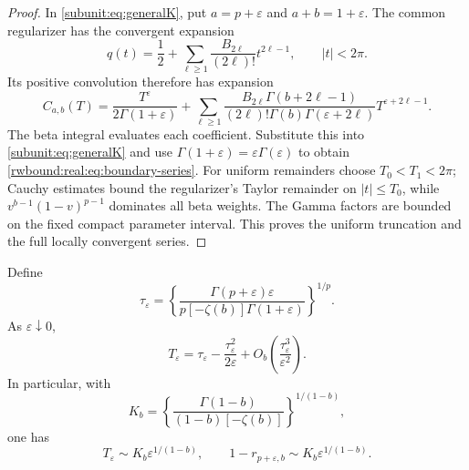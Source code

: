 \begin{proof}
In \eqref{subunit:eq:generalK}, put $a=p+\varepsilon$ and
$a+b=1+\varepsilon$. The common regularizer has the convergent expansion
\[
 q(t)=\frac12+\sum_{\ell\ge1}\frac{B_{2\ell}}{(2\ell)!}t^{2\ell-1},
 \qquad |t|<2\pi.
\]
Its positive convolution therefore has expansion
\[
 C_{a,b}(T)=\frac{T^\varepsilon}{2\Gamma(1+\varepsilon)}
 +\sum_{\ell\ge1}\frac{B_{2\ell}\Gamma(b+2\ell-1)}
 {(2\ell)!\Gamma(b)\Gamma(\varepsilon+2\ell)}T^{\varepsilon+2\ell-1}.
\]
The beta integral evaluates each coefficient. Substitute this into
\eqref{subunit:eq:generalK} and use
$\Gamma(1+\varepsilon)=\varepsilon\Gamma(\varepsilon)$ to obtain
\eqref{rwbound:real:eq:boundary-series}. For uniform remainders choose
$T_0<T_1<2\pi$; Cauchy estimates bound the regularizer's Taylor remainder
on $|t|\le T_0$, while $v^{b-1}(1-v)^{p-1}$ dominates all beta weights.
The Gamma factors are bounded on the fixed compact parameter interval.
This proves the uniform truncation and the full locally convergent series.
\end{proof}

\begin{theorem}
\label{rwbound:real:thm:boundary-crossing}
Define
\begin{equation}\label{rwbound:real:eq:tau}
 \tau_\varepsilon=
 \left\{\frac{\Gamma(p+\varepsilon)\varepsilon}
 {p[-\zeta(b)]\Gamma(1+\varepsilon)}\right\}^{1/p}.
\end{equation}
As $\varepsilon\downarrow0$,
\begin{equation}\label{rwbound:real:eq:crossing-correction}
 T_\varepsilon
 =\tau_\varepsilon-\frac{\tau_\varepsilon^2}{2\varepsilon}
   +O_b\!\left(\frac{\tau_\varepsilon^3}{\varepsilon^2}\right).
\end{equation}
In particular, with
\begin{equation}\label{rwbound:real:eq:boundary-constant}
 K_b=\left\{\frac{\Gamma(1-b)}{(1-b)[-\zeta(b)]}\right\}^{1/(1-b)},
\end{equation}
one has
\begin{equation}\label{rwbound:real:eq:crossing-leading}
 T_\varepsilon\sim K_b\varepsilon^{1/(1-b)},\qquad
 1-r_{p+\varepsilon,b}\sim K_b\varepsilon^{1/(1-b)}.
\end{equation}
\end{theorem}

